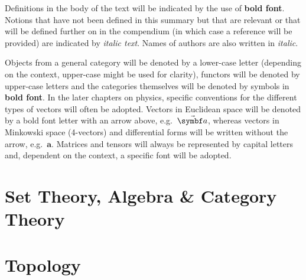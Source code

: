\documentclass[12pt, a4paper]{report}
\begin{document}
   Definitions in the body of the text will be indicated by the use of \textbf{bold font}. Notions that have not been defined in this summary but that are relevant or that will be defined further on in the compendium (in which case a reference will be provided) are indicated by \textit{italic text}. Names of authors are also written in \textit{italic}.

   Objects from a general category will be denoted by a lower-case letter (depending on the context, upper-case might be used for clarity), functors will be denoted by upper-case letters and the categories themselves will be denoted by symbols in \textbf{bold font}. In the later chapters on physics, specific conventions for the different types of vectors will often be adopted. Vectors in Euclidean space will be denoted by a bold font letter with an arrow above, e.g.~$\vector{a}$, whereas vectors in Minkowski space (4-vectors) and differential forms will be written without the arrow, e.g.~$\symbf{a}$. Matrices and tensors will always be represented by capital letters and, dependent on the context, a specific font will be adopted.

\part{Set Theory, Algebra \& Category Theory}
\parttoc

% 

% 
% 
% 

\part{Topology}
\parttoc

% 
% 
% 
% 




% 
% 
% 
% 

\end{document}
